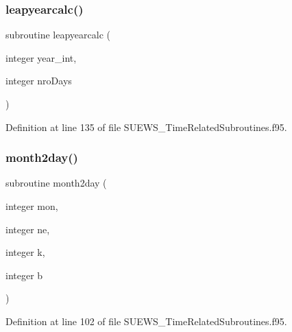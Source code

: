 \subsubsection{\texorpdfstring{leapyearcalc()}{leapyearcalc()}}
{\footnotesize\ttfamily subroutine leapyearcalc (\begin{DoxyParamCaption}\item[{integer}]{year\+\_\+int,  }\item[{integer}]{nro\+Days }\end{DoxyParamCaption})}



Definition at line 135 of file S\+U\+E\+W\+S\+\_\+\+Time\+Related\+Subroutines.\+f95.

\mbox{\label{_s_u_e_w_s___time_related_subroutines_8f95_afdee38b1c29d0a50a81cd92530f44dd4}} 
\subsubsection{\texorpdfstring{month2day()}{month2day()}}
{\footnotesize\ttfamily subroutine month2day (\begin{DoxyParamCaption}\item[{integer}]{mon,  }\item[{integer}]{ne,  }\item[{integer}]{k,  }\item[{integer}]{b }\end{DoxyParamCaption})}



Definition at line 102 of file S\+U\+E\+W\+S\+\_\+\+Time\+Related\+Subroutines.\+f95.

